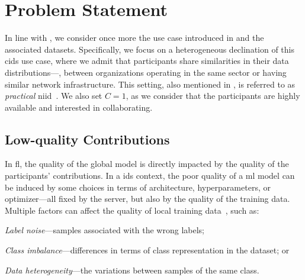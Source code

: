 \section{Problem Statement\label{sec:radar.problem}}

In line with , we consider once more the use case introduced in  and the associated datasets.
Specifically, we focus on a heterogeneous declination of this \gls{cids} use case, where we admit that participants share similarities in their data distributions---\eg, between organizations operating in the same sector or having similar network infrastructure.
This setting, also mentioned in , is referred to as \emph{practical} \gls{niid}~\cite{huang_PersonalizedCrossSiloFederated_2021}.
We also set $C=1$, as we consider that the participants are highly available and interested in collaborating.


\subsection{Low-quality Contributions\label{sec:radar.problem.quality}}

In \gls{fl}, the quality of the global model is directly impacted by the quality of the participants' contributions.
In a \gls{ids} context, the poor quality of a \gls{ml} model can be induced by some choices in terms of architecture, hyperparameters, or optimizer---all fixed by the server, but also by the quality of the training data.
Multiple factors can affect the quality of local training data~\cite{jain_OverviewImportanceData_2020}, such as: 
\begin{enumerate*}[(1)]
  \item \emph{Label noise}---samples associated with the wrong labels;
  \item \emph{Class imbalance}---differences in terms of class representation in the dataset; or
  \item \emph{Data heterogeneity}---the variations between samples of the same class.
\end{enumerate*}

